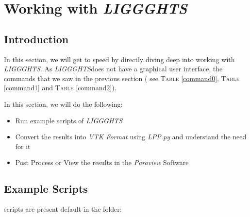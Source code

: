 \documentclass{tufte-book} %
\newcommand{\Li}{\textit{LIGGGHTS}}
\begin{document}

\chapter{Working with \Li}
\label{ch:2}

\section[Introduction]{Introduction}

\begin{fullwidth}
  In this section, we will get to speed by directly diving deep into working with \Li. As \Li does not have a graphical user interface, the commands that we saw in the previous section ( see \textsc{Table} \ref{command0}, \textsc{Table} \ref{command1} and \textsc{Table} \ref{command2}).
  \end{fullwidth}


  In this section, we will do the following:
  \begin{itemize}
  \item Run example scripts of \Li
  \item Convert the results into \textit{VTK Format} using \textit{LPP.py} and understand the need for it
  \item Post Process or View the results in the \textit{Paraview} Software
  
  \end{itemize}

 \section[Example Scripts]{Example Scripts}

  scripts are present default in the folder:
\end{document}
